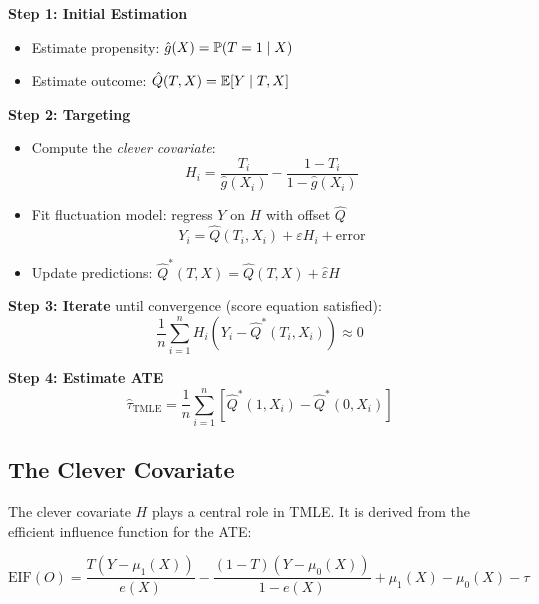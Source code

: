 \begin{definition}
\label{def:tmle_algorithm}
\textbf{Step 1: Initial Estimation}
\begin{itemize}
    \item Estimate propensity: $\hat{g}(X) = \mathbb{P}(T=1 \mid X)$
    \item Estimate outcome: $\hat{Q}(T, X) = \mathbb{E}[Y \mid T, X]$
\end{itemize}

\textbf{Step 2: Targeting}
\begin{itemize}
    \item Compute the \emph{clever covariate}:
    \begin{equation}
    H_i = \frac{T_i}{\hat{g}(X_i)} - \frac{1 - T_i}{1 - \hat{g}(X_i)}
    \label{eq:clever_covariate}
    \end{equation}
    \item Fit fluctuation model: regress $Y$ on $H$ with offset $\hat{Q}$
    \begin{equation}
    Y_i = \hat{Q}(T_i, X_i) + \varepsilon H_i + \text{error}
    \end{equation}
    \item Update predictions: $\hat{Q}^*(T, X) = \hat{Q}(T, X) + \hat{\varepsilon} H$
\end{itemize}

\textbf{Step 3: Iterate} until convergence (score equation satisfied):
\begin{equation}
\frac{1}{n}\sum_{i=1}^{n} H_i (Y_i - \hat{Q}^*(T_i, X_i)) \approx 0
\end{equation}

\textbf{Step 4: Estimate ATE}
\begin{equation}
\hat{\tau}_{\text{TMLE}} = \frac{1}{n}\sum_{i=1}^{n} \left[ \hat{Q}^*(1, X_i) - \hat{Q}^*(0, X_i) \right]
\end{equation}
\end{definition}

\subsection{The Clever Covariate}

The clever covariate $H$ plays a central role in TMLE. It is derived from the efficient influence function for the ATE:

\begin{equation}
\text{EIF}(O) = \frac{T(Y - \mu_1(X))}{e(X)} - \frac{(1-T)(Y - \mu_0(X))}{1 - e(X)} + \mu_1(X) - \mu_0(X) - \tau
\end{equation}

